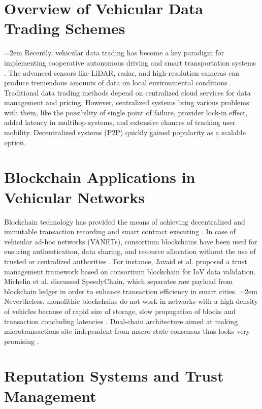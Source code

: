 \section{Overview of Vehicular Data Trading Schemes}\label{sec:lit_data_trading}

{\emergencystretch=2em
\noindent
Recently, vehicular data trading has become a key paradigm for implementing cooperative autonomous driving and smart transportation systems \cite{chen2025lbdt}. The advanced sensors like LiDAR, radar, and high-resolution cameras can produce tremendous amounts of data on local environmental conditions \cite{kang2019toward}. Traditional data trading methods depend on centralized cloud services for data management and pricing. However, centralized systems bring various problems with them, like the possibility of single point of failure, provider lock-in effect, added latency in multihop systems, and extensive chances of tracking user mobility. Decentralized systems (P2P) quickly gained popularity as a scalable option.
}

\section{Blockchain Applications in Vehicular Networks}\label{sec:lit_blockchain}

\noindent
Blockchain technology has provided the means of achieving decentralized and immutable transaction recording and smart contract executing \cite{nakamoto2008bitcoin}. In case of vehicular ad-hoc networks (VANETs), consortium blockchains have been used for ensuring authentication, data sharing, and resource allocation without the use of trusted or centralized authorities \cite{yang2019privacy, firdaus2021blockchain}. For instance, Javaid et al. \cite{javaid2020scalable} proposed a trust management framework based on consortium blockchain for IoV data validation. Michelin et al\cite{michelin2018speedychain}. discussed SpeedyChain, which separates raw payload from blockchain ledger in order to enhance transaction efficiency in smart cities. 
{\emergencystretch=2em
\noindent
Nevertheless, monolithic blockchains do not work in networks with a high density of vehicles because of rapid size of storage, slow propagation of blocks and transaction concluding latencies \cite{liu2018computation}. Dual-chain architecture aimed at making microtransactions site independent from macro-state consensus thus looks very promising \cite{chen2025lbdt}.
}

\section{Reputation Systems and Trust Management}\label{sec:lit_reputation}

